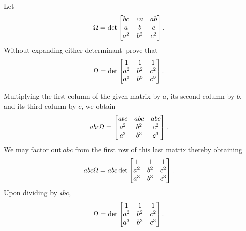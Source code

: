 \section*{}
\begin{pro}
 Let $$\Omega =
\det
\begin{bmatrix} bc & ca & ab \cr a & b & c \cr a^2 & b^2 & c^2 \cr\end{bmatrix}
.
$$Without expanding either determinant, prove that
$$\Omega = \det
\begin{bmatrix} 1 & 1 & 1 \cr a^2 & b^2 & c^2 \cr a^3 & b^3 & c^3
\cr\end{bmatrix}.
$$
\begin{answer} Multiplying the first column of the given matrix  by $a$,
its second column by $b$, and its third column by $c$, we obtain
$$abc\Omega =  \begin{bmatrix} abc & abc & abc \cr a^2 & b^2 & c^2 \cr a^3 & b^3 & c^3 \cr\end{bmatrix}. $$ We may factor out
$abc$ from the first row of this last matrix thereby obtaining
$$abc\Omega = abc\det
\begin{bmatrix} 1 & 1 & 1 \cr a^2 & b^2 & c^2 \cr a^3 & b^3 & c^3
\cr\end{bmatrix}. $$Upon dividing by $abc$,
$$\Omega = \det
\begin{bmatrix} 1 & 1 & 1 \cr a^2 & b^2 & c^2 \cr a^3 & b^3 & c^3
\cr\end{bmatrix}.
$$
\end{answer}
\end{pro}
